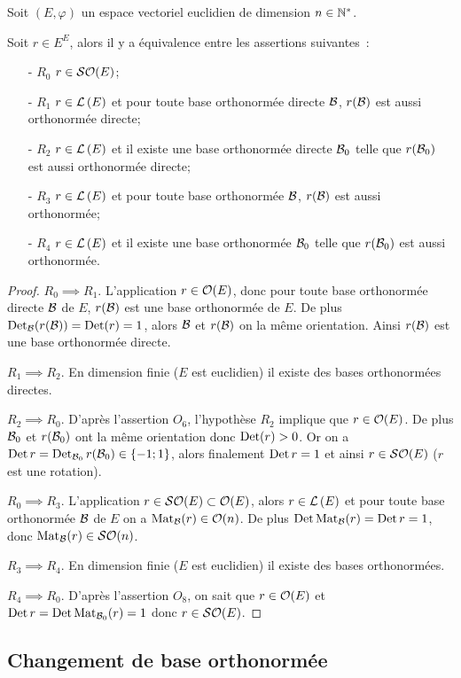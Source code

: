 Soit $(E,\varphi)$ un espace vectoriel euclidien de dimension $n \in \mathbb{N}^*$.
\begin{theo}
  Soit $r \in E^E$, alors il y a équivalence entre les assertions suivantes~:
  \begin{itemize}
  \item[- $R_0$] $r \in \mathcal{SO}\!\left(E\right)$;
  \item[- $R_1$] $r \in \mathcal{L}\left(E\right)$ et pour toute base orthonormée directe $\mathcal{B}$, $r(\mathcal{B})$ est aussi orthonormée directe;
  \item[- $R_2$] $r \in \mathcal{L}\left(E\right)$ et il existe une base orthonormée directe $\mathcal{B}_0$ telle que $r(\mathcal{B}_0)$ est aussi orthonormée directe;
  \item[- $R_3$] $r \in \mathcal{L}\left(E\right)$ et pour toute base orthonormée $\mathcal{B}$, $r(\mathcal{B})$ est aussi orthonormée;
  \item[- $R_4$] $r \in \mathcal{L}\left(E\right)$ et il existe une base orthonormée $\mathcal{B}_0$ telle que $r(\mathcal{B}_0)$ est aussi orthonormée.
  \end{itemize}
\end{theo}
\begin{proof}
  $R_0 \implies R_1$. L'application $r \in \mathcal{O}\!\left(E\right)$, donc pour toute base orthonormée directe $\mathcal{B}$ de $E$, $r(\mathcal{B})$ est une base orthonormée de $E$. De plus $\operatorname{Det}_{\mathcal{B}}(r(\mathcal{B}))=\operatorname{Det}(r) =1$, alors $\mathcal{B}$ et $r(\mathcal{B})$ on la même orientation. Ainsi $r(\mathcal{B})$ est une base orthonormée directe.

  $R_1 \implies R_2$. En dimension finie ($E$ est euclidien) il existe des bases orthonormées directes.

  $R_2 \implies R_0$. D'après l'assertion $O_6$, l'hypothèse $R_2$ implique que $r \in \mathcal{O}\!\left(E\right)$. De plus $\mathcal{B}_0$ et $r(\mathcal{B}_0)$ ont la même orientation donc $\operatorname{Det}(r)>0$. Or on a $\operatorname{Det} r = \operatorname{Det}_{\mathcal{B}_0}r(\mathcal{B}_0) \in \{-1; 1\}$, alors finalement $\operatorname{Det} r = 1$ et ainsi $r \in \mathcal{SO}\!\left(E\right)$ ($r$ est une rotation).

  $R_0 \implies R_3$. L'application $r \in \mathcal{SO}\!\left(E\right) \subset \mathcal{O}\!\left(E\right)$, alors $r \in \mathcal{L}\left(E\right)$ et pour toute base orthonormée $\mathcal{B}$ de $E$ on a $\mathrm{Mat}_{\mathcal{B}}(r) \in \mathcal{O}\!\left(n\right)$. De plus $\operatorname{Det} \mathrm{Mat}_{\mathcal{B}}(r) = \operatorname{Det} r = 1$, donc $\mathrm{Mat}_{\mathcal{B}}(r) \in \mathcal{SO}\!\left(n\right)$.

  $R_3 \implies R_4$. En dimension finie ($E$ est euclidien) il existe des bases orthonormées.

  $R_4 \implies R_0$. D'après l'assertion $O_8$, on sait que $r \in \mathcal{O}\!\left(E\right)$ et $\operatorname{Det} r = \operatorname{Det} \mathrm{Mat}_{\mathcal{B}_0}(r) =1$ donc $r \in \mathcal{SO}\!\left(E\right)$.
\end{proof}

\subsection{Changement de base orthonormée}

